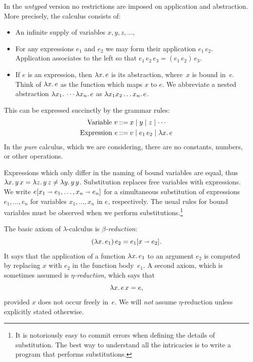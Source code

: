 In the \emph{untyped} version no restrictions are imposed on
application and abstraction. More precisely, the calculus consists of:
%
\begin{itemize}
\item An infinite supply of variables $x, y, z, \ldots$,
\item For any expressions $e_1$ and $e_2$ we may form their
  application $e_1\, e_2$. Application associates to the left so that
  $e_1\, e_2\, e_3 = (e_1\, e_2)\, e_3$.
\item If $e$ is an expression, then $\lambda x .\,e$ is its abstraction,
  where~$x$ is bound in~$e$. Think of $\lambda x .\,e$ as the function
  which maps $x$ to $e$. We abbreviate a nested abstraction
  $\lambda x_1 .\,\cdots \lambda x_n .\,e$ as $\lambda x_1 x_2 \ldots x_n .\,e$.
\end{itemize}
%
This can be expressed succinctly by the grammar rules:
%
\begin{align*}
  \text{Variable}\ v &\mathbin{{:}{:}{=}} x \mid y \mid z \mid \cdots \\
  \text{Expression}\ e &\mathbin{{:}{:}{=}} v \mid e_1\,e_2 \mid \lambda x .\,e
\end{align*}
%
In the \emph{pure} calculus, which we are considering, there are no
constants, numbers, or other operations.

Expressions which only differ in the naming of bound variables are
equal, thus $\lambda x .\,y\, x = \lambda z .\,y\, z \neq \lambda y .\,y\,
  y$. Substitution replaces free variables with expressions. We write
$e[x_1 \shortrightarrow e_1, \ldots, x_n \shortrightarrow e_n]$ for a
simultaneous substitution of expressions $e_1, \ldots, e_n$ for
variables $x_1, \ldots, x_n$ in $e$, respectively. The usual rules for
bound variables must be observed when we perform
substitutions.\footnote{It is notoriously easy to commit errors when
  defining the details of substitution. The best way to understand all
  the intricacies is to write a program that performs substitutions.}

The basic axiom of $\lambda$-calculus is \emph{$\beta$-reduction}:
%
\begin{equation*}
  (\lambda x .\,e_1)\, e_2 = e_1[x \shortrightarrow e_2].
\end{equation*}
%
It says that the application of a function $\lambda x .\,e_1$ to an
argument $e_2$ is computed by replacing $x$ with $e_2$ in the function
body~$e_1$. A second axiom, which is sometimes assumed is
\emph{$\eta$-reduction}, which says that
%
\begin{equation*}
  \lambda x .\,e\, x = e,
\end{equation*}
%
provided $x$ does not occur freely in~$e$. We will \emph{not} assume
$\eta$-reduction unless explicitly stated otherwise.

